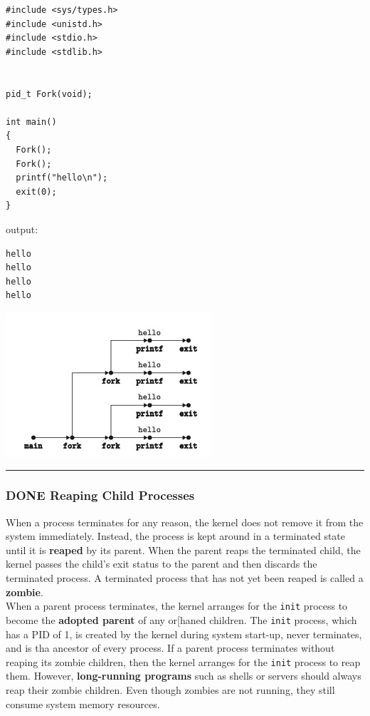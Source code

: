 \documentclass[11pt]{article}
\begin{document}
\begin{verbatim}
#include <sys/types.h>
#include <unistd.h>
#include <stdio.h>
#include <stdlib.h>


pid_t Fork(void);

int main()
{
  Fork();
  Fork();
  printf("hello\n");
  exit(0);
}
\end{verbatim}

output:\\
\begin{verbatim}
hello
hello
hello
hello
\end{verbatim}

\begin{center}
\includegraphics[width=.9\linewidth]{pics/figure8.17-nested-fork.png}
\end{center}

\noindent\rule{\textwidth}{0.5pt}

\subsubsection{{\bfseries\sffamily DONE} Reaping Child Processes}
\label{sec:org462a2bc}
When a process terminates for any reason, the kernel does not remove it from the system immediately. Instead, the process is kept around in a terminated state until it is \textbf{reaped} by its parent. When the parent reaps the terminated child, the kernel passes the child’s exit status to the parent and then discards the terminated process. A terminated process that has not yet been reaped is called a \textbf{zombie}.\\

When a parent process terminates, the kernel arranges for the \texttt{init} process to become the \textbf{adopted parent} of any or[haned children. The \texttt{init} process, which has a PID of 1, is created by the kernel during system start-up, never terminates, and is tha ancestor of every process. If a parent process terminates without reaping its zombie children, then the kernel arranges for the \texttt{init} process to reap them. However, \textbf{long-running programs} such as shells or servers should always reap their zombie children. Even though zombies are not running, they still consume system memory resources.\\
\end{document}
